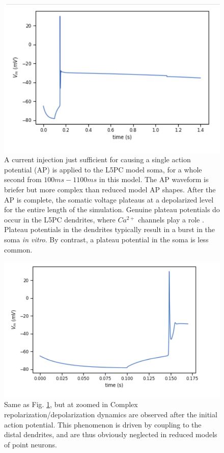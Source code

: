 \begin{figure}
\centering
\includegraphics[scale=0.8]{figures/correct_active_l5pc.png}
\caption[AP Waveform in the L5PC model (A)]{A current injection just sufficient for causing a single action potential (AP) is applied to the L5PC model soma, for a whole second from $100ms-1100ms$ in this model.
The AP waveform is briefer but more complex than reduced model AP shapes. After the AP is complete, the somatic voltage plateaus at a depolarized level for the entire length of the simulation.
Genuine plateau potentials do occur in the L5PC dendrites, where $Ca^{2+}$ channels play a role \citep{zhu2000maturation}.
Plateau potentials in the dendrites typically result in a burst in the soma \emph{in vitro}. 
By contrast, a plateau potential in the soma is less common.}
\label{fig:l5pc-a}
\end{figure}

\begin{figure}
 \begin{center}
\includegraphics[scale=0.8]{figures/spike_shape.png}
\caption[AP Waveform in the L5PC model (B)]{Same as Fig. \ref{fig:l5pc-a}, but at zoomed in
Complex repolarization/depolarization dynamics are observed after the initial action potential.
This phenomenon is driven by coupling to the distal dendrites, and are thus obviously neglected in reduced models of point neurons.}
\label{fig:l5pc-b}
\end{center}
\end{figure}

